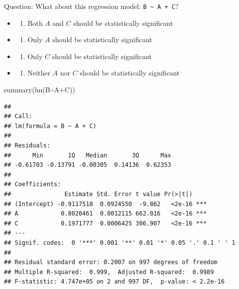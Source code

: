 \documentclass[
]{article}
\newenvironment{Shaded}{\begin{snugshade}}{\end{snugshade}}
\newcommand{\FunctionTok}[1]{\textcolor[rgb]{0.00,0.00,0.00}{#1}}
\newcommand{\NormalTok}[1]{#1}
\newcommand{\SpecialCharTok}[1]{\textcolor[rgb]{0.00,0.00,0.00}{#1}}
\providecommand{\tightlist}{%
  \setlength{\itemsep}{0pt}\setlength{\parskip}{0pt}}
\begin{document}
Question: What about this regression model:
\texttt{B\ \textasciitilde{}\ A\ +\ C}?

\begin{itemize}
\item
  \begin{enumerate}
  \def\labelenumi{\alph{enumi})}
  \tightlist
  \item
    Both \(A\) and \(C\) should be statistically significant
  \end{enumerate}
\item
  \begin{enumerate}
  \def\labelenumi{\alph{enumi})}
  \setcounter{enumi}{1}
  \tightlist
  \item
    Only \(A\) should be statistically significant
  \end{enumerate}
\item
  \begin{enumerate}
  \def\labelenumi{\alph{enumi})}
  \setcounter{enumi}{2}
  \tightlist
  \item
    Only \(C\) should be statistically significant
  \end{enumerate}
\item
  \begin{enumerate}
  \def\labelenumi{\alph{enumi})}
  \setcounter{enumi}{3}
  \tightlist
  \item
    Neither \(A\) nor \(C\) should be statistically significant
  \end{enumerate}
\end{itemize}

\begin{Shaded}
\begin{Highlighting}[]
\FunctionTok{summary}\NormalTok{(}\FunctionTok{lm}\NormalTok{(B}\SpecialCharTok{\textasciitilde{}}\NormalTok{A}\SpecialCharTok{+}\NormalTok{C))}
\end{Highlighting}
\end{Shaded}

\begin{verbatim}
## 
## Call:
## lm(formula = B ~ A + C)
## 
## Residuals:
##      Min       1Q   Median       3Q      Max 
## -0.61703 -0.13791 -0.00305  0.14136  0.62353 
## 
## Coefficients:
##               Estimate Std. Error t value Pr(>|t|)    
## (Intercept) -0.9117518  0.0924550  -9.862   <2e-16 ***
## A            0.8020461  0.0012115 662.016   <2e-16 ***
## C            0.1971777  0.0006425 306.907   <2e-16 ***
## ---
## Signif. codes:  0 '***' 0.001 '**' 0.01 '*' 0.05 '.' 0.1 ' ' 1
## 
## Residual standard error: 0.2007 on 997 degrees of freedom
## Multiple R-squared:  0.999,  Adjusted R-squared:  0.9989 
## F-statistic: 4.747e+05 on 2 and 997 DF,  p-value: < 2.2e-16
\end{verbatim}
\end{document}
